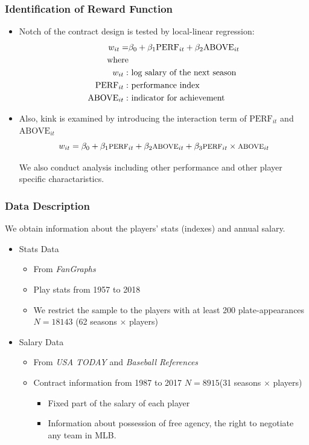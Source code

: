 \documentclass[dvipdfmx,12pt]{beamer}
\begin{document}
\begin{frame}\frametitle{Identification of Reward Function}
  \begin{itemize}
    \small
    \item Notch of the contract design is tested by local-linear regression:
    \begin{align*}
      \footnotesize
      w_{it} = & \beta_0 + \beta_1 \text{PERF}_{it} + \beta_2 \text{ABOVE}_{it} \\
      \text{where} \\
      w_{it}: & \text{ log salary of the next season} \\
      \text{PERF}_{it}: & \text{ performance index} \\
      \text{ABOVE}_{it}: & \text{ indicator for achievement}
    \end{align*}

    \item Also, kink is examined by introducing the interaction term of $\text{PERF}_{it}$ and $\text{ABOVE}_{it}$
    \[
    \footnotesize
    w_{it} = \beta_0 + \beta_1 \text{PERF}_{it} + \beta_2 \text{ABOVE}_{it} + \beta_3 \text{PERF}_{it} \times \text{ABOVE}_{it}
    \]

    We also conduct analysis including other performance and other player specific charactaristics.
  \end{itemize}
\end{frame}

\begin{frame}\frametitle{Data Description}
  We obtain information about the players' stats (indexes) and annual salary.
  \begin{itemize}
    \item Stats Data
    \begin{itemize}
      \item From \textit{FanGraphs}

      \item Play stats from 1957 to 2018

      \item We restrict the sample to the players with at least 200 plate-appearances $N=18143$ (62 seasons $\times$ players)
    \end{itemize}
    \item Salary Data
    \begin{itemize}
      \item From \textit{USA TODAY} and \textit{Baseball References}

      \item Contract information from 1987 to 2017 $N=8915$(31 seasons $\times$ players)
      \begin{itemize}
        \item Fixed part of the salary of each player

        \item Information about possession of free agency, the right to negotiate any team in MLB.
      \end{itemize}
    \end{itemize}
  \end{itemize}
\end{frame}
\end{document}
